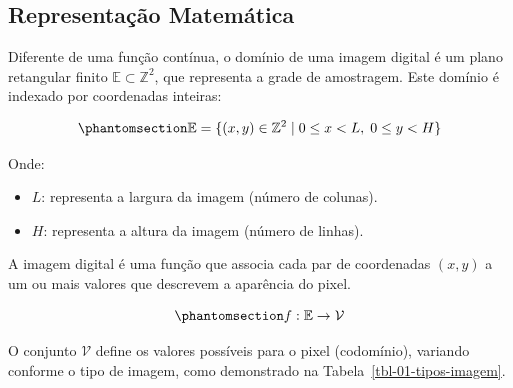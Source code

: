 \documentclass[
  portuguese,
  letterpaper,
  openany,
  oneside,
  12pt,
  a4paper]{book}
\providecommand{\tightlist}{%
  \setlength{\itemsep}{0pt}\setlength{\parskip}{0pt}}
\begin{document}
\subsection*{Representação
Matemática}\label{representauxe7uxe3o-matemuxe1tica}

Diferente de uma função contínua, o domínio de uma imagem digital é um
plano retangular finito \(\mathbb{E} \subset \mathbb{Z}^2\), que
representa a grade de amostragem. Este domínio é indexado por
coordenadas inteiras:

\begin{equation}\phantomsection\label{eq-01-dominio}{
\mathbb{E}  = \{ (x, y) \in \mathbb{Z}^2 \mid 0 \le x < L,\; 0 \le y < H \}
}\end{equation}

Onde:

\begin{itemize}
\tightlist
\item
  \textbf{\(L\)}: representa a largura da imagem (número de colunas).
\item
  \textbf{\(H\)}: representa a altura da imagem (número de linhas).
\end{itemize}

A imagem digital é uma função que associa cada par de coordenadas
\((x,y)\) a um ou mais valores que descrevem a aparência do pixel.

\begin{equation}\phantomsection\label{eq-01-image}{
f: \mathbb{E}  \to \mathcal{V}
}\end{equation}

O conjunto \(\mathcal{V}\) define os valores possíveis para o pixel
(codomínio), variando conforme o tipo de imagem, como demonstrado na
Tabela~\ref{tbl-01-tipos-imagem}.
\end{document}

